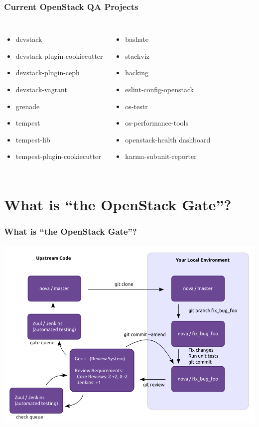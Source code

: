\documentclass[aspectratio=169,11pt,hyperref={colorlinks=true}]{beamer}
\begin{document}
\begin{frame}
    \frametitle{Current OpenStack QA Projects}
    \begin{columns}
            \begin{itemize}
                \item{devstack}
                \item{devstack-plugin-cookiecutter}
                \item{devstack-plugin-ceph}
                \item{devstack-vagrant}
                \item{grenade}
                \item{tempest}
                \item{tempest-lib}
                \item{tempest-plugin-cookiecutter}
            \end{itemize}
            \begin{itemize}
                \item{bashate}
                \item{stackviz}
                \item{hacking}
                \item{eslint-config-openstack}
                \item{os-testr}
                \item{os-performance-tools}
                \item{openstack-health dashboard}
                \item{karma-subunit-reporter}
            \end{itemize}
    \end{columns}
\end{frame}

\section{What is ``the OpenStack Gate''?}
\begin{frame}
    \frametitle{What is ``the OpenStack Gate''?}
    \begin{center}
        \includegraphics[width=.83\textwidth]{code_review.png}
    \end{center}
\end{frame}
\end{document}
